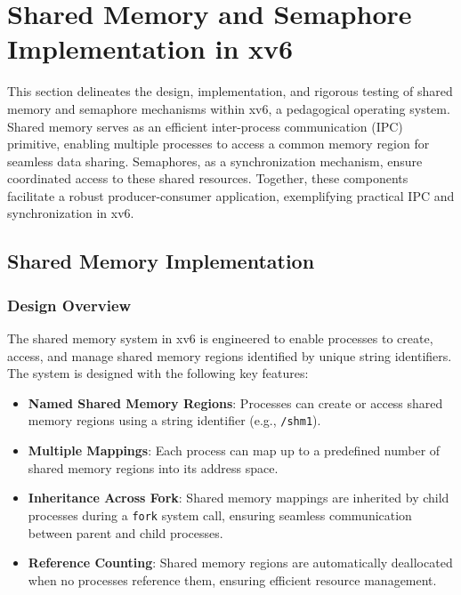 \documentclass[12pt]{article}
\begin{document}
\section{Shared Memory and Semaphore Implementation in xv6}
\label{sec:implementation}

This section delineates the design, implementation, and rigorous testing of shared memory and semaphore mechanisms within xv6, a pedagogical operating system. Shared memory serves as an efficient inter-process communication (IPC) primitive, enabling multiple processes to access a common memory region for seamless data sharing. Semaphores, as a synchronization mechanism, ensure coordinated access to these shared resources. Together, these components facilitate a robust producer-consumer application, exemplifying practical IPC and synchronization in xv6.

\subsection{Shared Memory Implementation}
\label{subsec:shared-memory-implementation}

\subsubsection{Design Overview}
\label{subsubsec:shared-memory-design}

The shared memory system in xv6 is engineered to enable processes to create, access, and manage shared memory regions identified by unique string identifiers. The system is designed with the following key features:
\begin{itemize}
  \item \textbf{Named Shared Memory Regions}: Processes can create or access shared memory regions using a string identifier (e.g., \texttt{/shm1}).
  \item \textbf{Multiple Mappings}: Each process can map up to a predefined number of shared memory regions into its address space.
  \item \textbf{Inheritance Across Fork}: Shared memory mappings are inherited by child processes during a \texttt{fork} system call, ensuring seamless communication between parent and child processes.
  \item \textbf{Reference Counting}: Shared memory regions are automatically deallocated when no processes reference them, ensuring efficient resource management.
\end{itemize}
\end{document}
